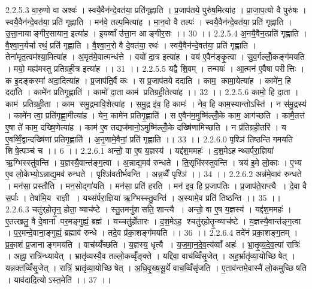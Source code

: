 2.2.5.3
वा॒रु॒णो वा अश्वः॑ । स्वयै॒वैन॑न्दे॒वत॑या॒ प्रति॑गृह्णाति । प्र॒जाप॑तये॒ पुरु॑ष॒मित्या॑ह । प्रा॒जा॒प॒त्यो वै पुरु॑षः । स्वयै॒वैन॑न्दे॒वत॑या॒ प्रति॑ गृह्णाति । मन॑वे॒ तल्प॒मित्या॑ह । मा॒न॒वो वै तल्पः॑ । स्वयै॒वैन॑न्दे॒वत॑या॒ प्रति॑ गृह्णाति । उ॒त्ता॒नायाङ्गीर॒सायान॒ इत्या॑ह । इ॒यव्वाँ उ॑त्ता॒न आङ्गीर॒सः ।। 30 ।।
2.2.5.4
अ॒नयै॒वैन॒त्प्रति॑ गृह्णाति । वै॒श्वा॒न॒र्यर्चा रथं॒ प्रति॑ गृह्णाति । वै॒श्वा॒न॒रो वै दे॒वत॑या॒ रथः॑ । स्वयै॒वैन॑न्दे॒वत॑या॒ प्रति॑ गृह्णाति । तेना॑मृत॒त्वम॑श्या॒मित्या॑ह । अ॒मृत॑मे॒वात्मन्ध॑त्ते । वयो॑ दा॒त्र इत्या॑ह । वय॑ ए॒वैन॑ङ्कृ॒त्वा । सु॒व॒र्गल्लोँ॒कङ्ग॑मयति । मयो॒ मह्य॑मस्तु प्रतिग्रही॒त्र इत्या॑ह ।। 31 ।।
2.2.5.5
यद्वै शि॒वम् । तन्मयः॑ । आ॒त्मन॑ ए॒वैषा परीत्तिः । क इ॒दङ्कस्मा॑ अदा॒दित्या॑ह । प्र॒जाप॑ति॒र्वै कः । स प्र॒जाप॑तये ददाति । काम॒ कामा॒येत्या॑ह । कामे॑न॒ हि ददा॑ति । कामे॑न प्रतिगृ॒ह्णाति॑ । कामो॑ दा॒ता काम॑ प्रतिग्रही॒तेत्या॑ह ।। 32 ।।
2.2.5.6
कामो॒ हि दा॒ता । काम॑ प्रतिग्रही॒ता । काम॑ समु॒द्रमावि॒शेत्या॑ह । स॒मु॒द्र इ॑व॒ हि कामः॑ । नेव॒ हि काम॒स्यान्तोऽस्ति॑ । न स॑मु॒द्रस्य॑ । कामे॑न त्वा॒ प्रति॑गृह्णा॒मीत्या॑ह । येन॒ कामे॑न प्रतिगृ॒ह्णाति॑ । स ए॒वैन॑म॒मुष्मि॑ल्लोँ॒के काम॒ आग॑च्छति । कामै॒तत्त॑ ए॒षा ते॑ काम॒ दख्षि॒णेत्या॑ह । काम॑ ए॒व तद्यज॑मानो॒ऽमुष्मि॑ल्लोँ॒के दख्षि॑णामिच्छति । न प्र॑तिग्रही॒तरि॑ । य ए॒वव्विँ॒द्वान्दख्षि॑णां प्रतिगृ॒ह्णाति॑ । अ॒नृ॒णामे॒वैनां॒ प्रति॑ गृह्णाति ।। 33 ।।
2.2.6.0
पृश्ञि॑ तिष्ठन्ति गमयति शिषे॒त्पञ्च॑ च ।। 6 ।।
2.2.6.1
अन्तो॒ वा ए॒ष य॒ज्ञस्य॑ । यद्द॑श॒ममहः॑ । द॒श॒मेऽहन्थ्सर्परा॒ज्ञिया॑ ऋ॒ग्भिस्स्तु॑वन्ति । य॒ज्ञस्यै॒वान्त॑ङ्ग॒त्वा । अ॒न्नाद्य॒मव॑ रुन्धते । ति॒सृभि॑स्स्तुवन्ति । त्रय॑ इ॒मे लो॒काः । ए॒भ्य ए॒व लो॒केभ्यो॒ऽन्नाद्य॒मव॑ रुन्धते । पृश्ञि॑वतीर्भवन्ति । अन्न॒व्वैँ पृश्ञि॑ ।। 34 ।।
2.2.6.2
अन्न॑मे॒वाव॑ रुन्धते । मन॑सा॒ प्रस्तौ॑ति । मन॒सोद्गा॑यति । मन॑सा॒ प्रति॑ हरति । मन॑ इव॒ हि प्र॒जाप॑तिः । प्र॒जाप॑ते॒राप्त्यै । दे॒वा वै स॒र्पाः । तेषा॑मि॒य राज्ञी । यथ्स॑र्परा॒ज्ञिया॑ ऋ॒ग्भिस्स्तु॒वन्ति॑ । अ॒स्यामे॒व प्रति॑ तिष्ठन्ति ।। 35 ।।
2.2.6.3
चतु॑र्‌होतॄ॒न्॒ होता॒ व्याच॑ष्टे । स्तु॒तमनु॑शसति॒ शान्त्यै । अन्तो॒ वा ए॒ष य॒ज्ञस्य॑ । यद्द॑श॒ममहः॑ । ए॒तत्खलु॒ वै दे॒वानां पर॒मङ्गुह्यं॒ ब्रह्म॑ । यच्चतु॑र्होतारः । द॒श॒मेऽह॒॒ श्चतु॑र्‌होतॄ॒न्व्याच॑ष्टे । य॒ज्ञस्यै॒वान्त॑ङ्ग॒त्वा । प॒र॒मन्दे॒वाना॒ङ्गुह्यं॒ ब्रह्माव॑ रुन्धे । तदे॒व प्र॑का॒शङ्ग॑मयति ।। 36 ।।
2.2.6.4
तदे॑नं प्रका॒शङ्ग॒तम् । प्र॒का॒शं प्र॒जानाङ्गमयति । वाच॑य्यँच्छति । य॒ज्ञस्य॒ धृत्यै । य॒ज॒मा॒न॒दे॒व॒त्य॑व्वाँ अहः॑ । भ्रा॒तृ॒व्य॒दे॒व॒त्या॑ रात्रिः॑ । अह्ना॒ रात्रि॑न्ध्यायेत् । भ्रातृ॑व्यस्यै॒व तल्लो॒कव्वृँ॑ङ्क्ते । यद्दिवा॒ वाच॑व्विँसृ॒जेत् । अह॒र्भ्रातृ॑व्या॒योच्छि॑षेत् । यन्नक्त॑व्विँसृ॒जेत् । रात्रिं॒ भ्रातृ॑व्या॒योच्छि॑षेत् । अ॒धि॒वृ॒ख्ष॒सू॒र्ये वाच॒व्विँसृ॑जति । ए॒ताव॑न्तमे॒वास्मै॑ लो॒कमुच्छि॑षति । याव॑दादि॒त्योऽस्त॒मेति॑ ।। 37 ।।
